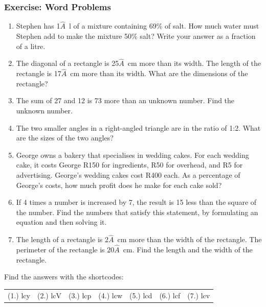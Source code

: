             \subsubsection{Exercise:  Word Problems }
            \nopagebreak
        \label{m39262*id162712}\begin{enumerate}[noitemsep, label=\textbf{\arabic*}. ] 
            \label{m39262*uid112}\item Stephen has 1\ensuremath{\hat{A}}~l of a mixture containing 69\% of salt. How much water must Stephen add to make the mixture 50\% salt? Write your answer as a fraction of a litre.
\hspace{1ex}        
\label{m39262*uid113}\item The diagonal of a rectangle is 25\ensuremath{\hat{A}}~cm more than its width. The length of the rectangle is 17\ensuremath{\hat{A}}~cm more than its width. What are the dimensions of the rectangle?
\hspace{1ex}        
\label{m39262*uid114}\item The sum of 27 and 12 is 73 more than an unknown number. Find the unknown number.
\hspace{1ex}        
\label{m39262*uid115}\item The two smaller angles in a right-angled triangle are in the ratio of 1:2. What are the sizes of the two angles?
\hspace{1ex}        
\label{m39262*uid116}\item George owns a bakery that specialises in wedding cakes. For each wedding cake, it costs George R150 for ingredients, R50 for overhead, and R5 for advertising. George's wedding cakes cost R400 each. As a percentage of George's costs, how much profit does he make for each cake sold?
\hspace{1ex}        
\label{m39262*uid117}\item If 4 times a number is increased by 7, the result is 15 less than the square of the number. Find the numbers that satisfy this statement, by formulating an equation and then solving it.
\hspace{1ex}        
\label{m39262*uid118}\item The length of a rectangle is 2\ensuremath{\hat{A}}~cm more than the width of the rectangle. The perimeter of the rectangle is 20\ensuremath{\hat{A}}~cm. Find the length and the width of the rectangle.
\hspace{1ex}        
\end{enumerate}
\label{m39262**end}
\par {} Find the answers with the shortcodes:
 \par \begin{tabular}[h]{cccccc}
 (1.) lcy  &  (2.) lcV  &  (3.) lcp  &  (4.) lcw  &  (5.) lcd  &  (6.) lcf  &  (7.) lcv  & \end{tabular}
